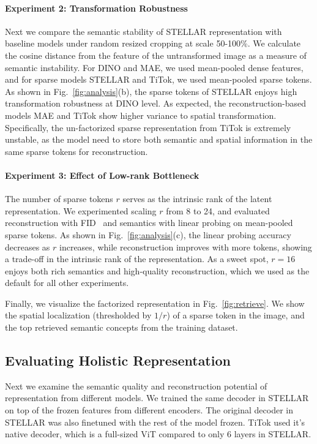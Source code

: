 \paragraph{Experiment 2: Transformation Robustness} 
Next we compare the semantic stability of STELLAR representation with baseline models under random resized cropping at scale 50-100\%. We calculate the cosine distance from the feature of the untransformed image as a measure of semantic instability. For DINO and MAE, we used mean-pooled dense features, and for sparse models STELLAR and TiTok, we used mean-pooled sparse tokens. As shown in Fig.~\ref{fig:analysis}(b), the sparse tokens of STELLAR enjoys high transformation robustness at DINO level. As expected, the reconstruction-based models MAE and TiTok show higher variance to spatial transformation. Specifically, the un-factorized sparse representation from TiTok is extremely unstable, as the model need to store both semantic and spatial information in the same sparse tokens for reconstruction.
\paragraph{Experiment 3: Effect of Low-rank Bottleneck} 
The number of sparse tokens $r$ serves as the intrinsic rank of the latent representation. We experimented scaling $r$
from 8 to 24, and evaluated reconstruction with FID~\citep{NIPS2017_8a1d6947} and semantics with linear probing on mean-pooled sparse tokens. As shown in Fig.~\ref{fig:analysis}(c), the linear probing accuracy decreases as $r$ increases, while reconstruction improves with more tokens, showing a trade-off in the intrinsic rank of the representation. As a sweet spot, $r=16$ enjoys both rich semantics and high-quality reconstruction, which we used as the default for all other experiments.

Finally, we visualize the factorized representation in Fig.~\ref{fig:retrieve}. We show the spatial localization (thresholded by $1/r$) of a sparse token in the image, and the top retrieved semantic concepts from the training dataset.


\subsection{Evaluating Holistic Representation}

Next we examine the semantic quality and reconstruction potential of representation from different models. We trained the same decoder in STELLAR on top of the frozen features from different encoders. The original decoder in STELLAR was also finetuned with the rest of the model frozen. TiTok used it's native decoder, which is a full-sized ViT compared to only 6 layers in STELLAR.

